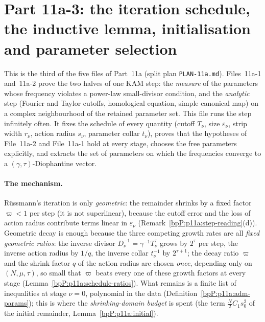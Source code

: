 \section{Part 11a-3: the iteration schedule, the inductive lemma, initialisation and parameter selection}\label{bpP:p11a3}
\begingroup\sloppy

\def\Ddom#1#2#3{\mathcal D(#1,#2;#3)}
\def\nrmm#1#2{\lVert #1\rVert_{#2}}
\def\LamD#1{\Lambda_{#1}}
\def\dgm#1{\lvert #1\rvert_{\mathrm{dg}}}
\def\opnm#1{\lvert #1\rvert_{\mathrm{op}}}
\def\Sh{\mathcal S}
\def\cutT{\mathcal T}

This is the third of the five files of Part~11a (split plan \texttt{PLAN-11a.md}). Files~11a-1 and~11a-2 prove the two halves of one KAM step: the \emph{measure} of the parameters whose frequency violates a power-law small-divisor condition, and the \emph{analytic} step (Fourier and Taylor cutoffs, homological equation, simple canonical map) on a complex neighbourhood of the retained parameter set. This file runs the step infinitely often. It fixes the schedule of every quantity (cutoff $T_\nu$, size $\varepsilon_\nu$, strip width $r_\nu$, action radius $s_\nu$, parameter collar $t_\nu$), proves that the hypotheses of File~11a-2 and File~11a-1 hold at every stage, chooses the free parameters explicitly, and extracts the set of parameters on which the frequencies converge to a $(\gamma,\tau)$-Diophantine vector.

\paragraph{The mechanism.} R\"ussmann's iteration is only \emph{geometric}: the remainder shrinks by a fixed factor $\varpi<1$ per step (it is not superlinear), because the cutoff error and the loss of action radius contribute terms linear in $\varepsilon_\nu$ (Remark~\ref{bpP:p11a:step-reading}(d)). Geometric decay is enough because the three competing growth rates are all \emph{fixed geometric ratios}: the inverse divisor $D_\nu^{-1}=\gamma^{-1}T_\nu^{\tau}$ grows by $2^{\tau}$ per step, the inverse action radius by $1/q$, the inverse collar $t_\nu^{-1}$ by $2^{\tau+1}$; the decay ratio $\varpi$ and the shrink factor $q$ of the action radius are chosen \emph{once}, depending only on $(N,\mu,\tau)$, so small that $\varpi$ beats every one of these growth factors at every stage (Lemma~\ref{bpP:p11a:schedule-ratios}). What remains is a finite list of inequalities at stage $\nu=0$, polynomial in the data (Definition~\ref{bpP:p11a:adm-params}); this is where the \emph{shrinking-domain budget} is spent (the term $\tfrac N2C_1s_0^2$ of the initial remainder, Lemma~\ref{bpP:p11a:initial}).

